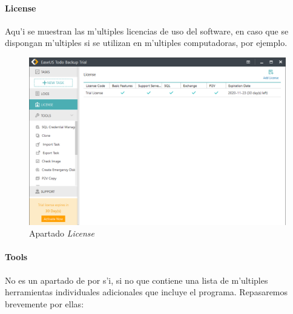\documentclass[11pt]{article}
\begin{document}
	\paragraph{License}
	
	Aqu'i se muestran las m'ultiples licencias de uso del software, en caso que se dispongan m'ultiples si se utilizan en m'ultiples computadoras, por ejemplo.
	
	\begin{figure}[H]
		\centering
		\includegraphics[width=.8\textwidth]{Images/easeus/use_license}
		\caption{Apartado \textit{License}}
	\end{figure} 
	
	\paragraph{Tools}
	
	No es un apartado de por s'i, si no que contiene una lista de m'ultiples herramientas individuales adicionales que incluye el programa. Repasaremos brevemente por ellas:
	
\end{document}
